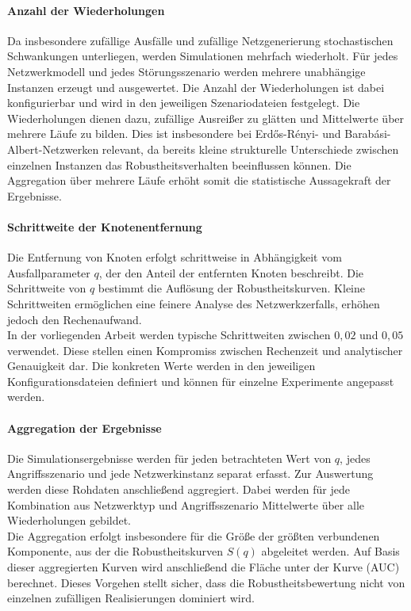 \paragraph{Anzahl der Wiederholungen}
Da insbesondere zufällige Ausfälle und zufällige Netzgenerierung
stochastischen Schwankungen unterliegen, werden Simulationen mehrfach
wiederholt. Für jedes Netzwerkmodell und jedes Störungsszenario werden mehrere
unabhängige Instanzen erzeugt und ausgewertet. Die Anzahl der Wiederholungen
ist dabei konfigurierbar und wird in den jeweiligen Szenariodateien festgelegt.
Die Wiederholungen dienen dazu, zufällige Ausreißer zu glätten und Mittelwerte
über mehrere Läufe zu bilden. Dies ist insbesondere bei Erdős{-}Rényi- und
Barabási{-}Albert-Netzwerken relevant, da bereits kleine strukturelle
Unterschiede zwischen einzelnen Instanzen das Robustheitsverhalten
beeinflussen können. Die Aggregation über mehrere Läufe erhöht somit die
statistische Aussagekraft der Ergebnisse.

\paragraph{Schrittweite der Knotenentfernung}
Die Entfernung von Knoten erfolgt schrittweise in Abhängigkeit vom
Ausfallparameter $q$, der den Anteil der entfernten Knoten beschreibt. Die
Schrittweite von $q$ bestimmt die Auflösung der Robustheitskurven. Kleine
Schrittweiten ermöglichen eine feinere Analyse des Netzwerkzerfalls, erhöhen
jedoch den Rechenaufwand.\\
In der vorliegenden Arbeit werden typische Schrittweiten zwischen $0{,}02$ und
$0{,}05$ verwendet. Diese stellen einen Kompromiss zwischen Rechenzeit und
analytischer Genauigkeit dar. Die konkreten Werte werden in den jeweiligen
Konfigurationsdateien definiert und können für einzelne Experimente angepasst
werden.

\paragraph{Aggregation der Ergebnisse}
Die Simulationsergebnisse werden für jeden betrachteten Wert von $q$, jedes
Angriffsszenario und jede Netzwerkinstanz separat erfasst. Zur Auswertung
werden diese Rohdaten anschließend aggregiert. Dabei werden für jede
Kombination aus Netzwerktyp und Angriffsszenario Mittelwerte über alle
Wiederholungen gebildet.\\
Die Aggregation erfolgt insbesondere für die Größe der größten verbundenen
Komponente, aus der die Robustheitskurven $S(q)$ abgeleitet werden. Auf Basis
dieser aggregierten Kurven wird anschließend die Fläche unter der Kurve (AUC)
berechnet. Dieses Vorgehen stellt sicher, dass die Robustheitsbewertung nicht
von einzelnen zufälligen Realisierungen dominiert wird.


